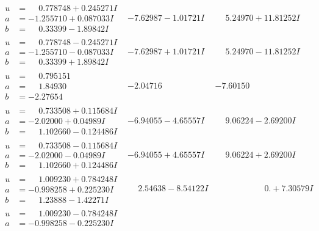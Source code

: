 \documentclass[1p]{elsarticle_modified}
\theoremstyle{definition}
\begin{document}
$$\begin{array}{c|c|c}
\begin{aligned}
u &= \phantom{-}0.778748 + 0.245271 I \\
a &= -1.255710 + 0.087033 I \\
b &= \phantom{-}0.33399 - 1.89842 I\end{aligned}
 & -7.62987 - 1.01721 I & \phantom{-}5.24970 + 11.81252 I \\ \hline\begin{aligned}
u &= \phantom{-}0.778748 - 0.245271 I \\
a &= -1.255710 - 0.087033 I \\
b &= \phantom{-}0.33399 + 1.89842 I\end{aligned}
 & -7.62987 + 1.01721 I & \phantom{-}5.24970 - 11.81252 I \\ \hline\begin{aligned}
u &= \phantom{-}0.795151\phantom{ +0.000000I} \\
a &= \phantom{-}1.84930\phantom{ +0.000000I} \\
b &= -2.27654\phantom{ +0.000000I}\end{aligned}
 & -2.04716\phantom{ +0.000000I} & -7.60150\phantom{ +0.000000I} \\ \hline\begin{aligned}
u &= \phantom{-}0.733508 + 0.115684 I \\
a &= -2.02000 + 0.04989 I \\
b &= \phantom{-}1.102660 - 0.124486 I\end{aligned}
 & -6.94055 - 4.65557 I & \phantom{-}9.06224 - 2.69200 I \\ \hline\begin{aligned}
u &= \phantom{-}0.733508 - 0.115684 I \\
a &= -2.02000 - 0.04989 I \\
b &= \phantom{-}1.102660 + 0.124486 I\end{aligned}
 & -6.94055 + 4.65557 I & \phantom{-}9.06224 + 2.69200 I \\ \hline\begin{aligned}
u &= \phantom{-}1.009230 + 0.784248 I \\
a &= -0.998258 + 0.225230 I \\
b &= \phantom{-}1.23888 - 1.42271 I\end{aligned}
 & \phantom{-}2.54638 - 8.54122 I & \phantom{-0.000000 -}0. + 7.30579 I \\ \hline\begin{aligned}
u &= \phantom{-}1.009230 - 0.784248 I \\
a &= -0.998258 - 0.225230 I \\

\end{aligned}
\end{array}$$
\end{document}
